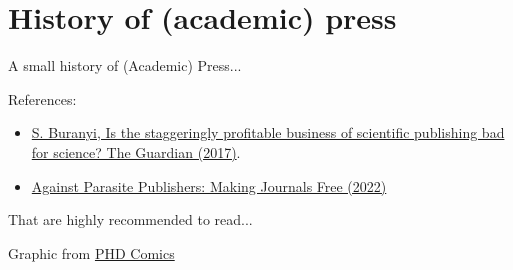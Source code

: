 \documentclass[10pt,compress,serif,aspectratio=169]{beamer}
\begin{document}
\section{History of (academic) press}
\begin{frame}[t]{A small history of (Academic) Press...}

  References:\\

  \begin{itemize}
    \item 
  \href{https://www.theguardian.com/science/2017/jun/27/profitable-business-scientific-publishing-bad-for-science}{S. Buranyi, Is the staggeringly profitable business of scientific publishing bad for science? The Guardian (2017)}.
  \item
    \href{https://doi.org/10.5281/zenodo.7212922}{Against Parasite Publishers: Making Journals Free (2022)}
\end{itemize}
    \vfill
\pause
  \begin{center}
    That are \alert{\Large highly} recommended to read...
  \end{center}
\vfill
  \begin{center}
    \small
    Graphic from \href{http://www.phdcomics.com/comics.php?f=1533}{PHD Comics}
  \end{center}
\end{frame}
\end{document}
